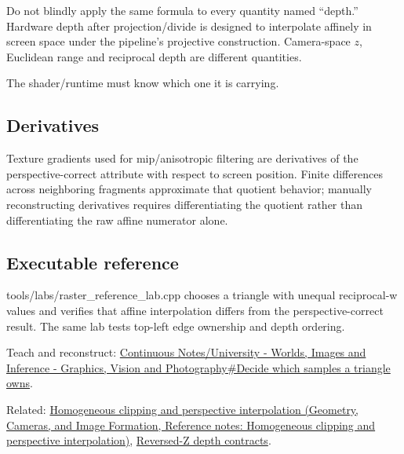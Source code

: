 \hypertarget{appendix-1ed5f96c73ea-depth-is-a-separate-contract}{}

Do not blindly apply the same formula to every quantity named ``depth.'' Hardware depth after projection/divide is designed to interpolate affinely in screen space under the pipeline's projective construction. Camera-space \(z\), Euclidean range and reciprocal depth are different quantities.

The shader/runtime must know which one it is carrying.

\subsection{Derivatives}\label{appendix-1ed5f96c73ea-derivatives}

\hypertarget{appendix-1ed5f96c73ea-derivatives}{}

Texture gradients used for mip/anisotropic filtering are derivatives of the perspective-correct attribute with respect to screen position. Finite differences across neighboring fragments approximate that quotient behavior; manually reconstructing derivatives requires differentiating the quotient rather than differentiating the raw affine numerator alone.

\subsection{Executable reference}\label{appendix-1ed5f96c73ea-executable-reference}

\hypertarget{appendix-1ed5f96c73ea-executable-reference}{}

tools/labs/raster\_reference\_lab.cpp chooses a triangle with unequal reciprocal-w values and verifies that affine interpolation differs from the perspective-correct result. The same lab tests top-left edge ownership and depth ordering.

Teach and reconstruct: \hyperref[03-visual-computing-i-ch012-decide-which-samples-a-triangle-owns]{Continuous Notes/University - Worlds, Images and Inference - Graphics, Vision and Photography\#Decide which samples a triangle owns}.

Related: \href{../03-Geometry-Cameras-and-Image-Formation/main.pdf\#nameddest=appendix-40426e4b2103}{Homogeneous clipping and perspective interpolation (Geometry, Cameras, and Image Formation, Reference notes: Homogeneous clipping and perspective interpolation)}, \hyperref[appendix-275ec8847057]{Reversed-Z depth contracts}.
